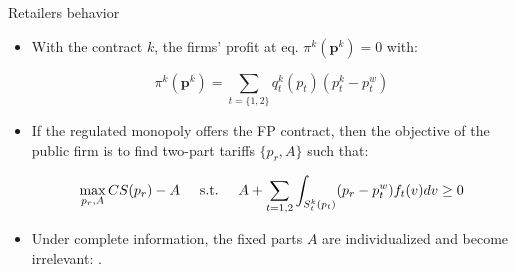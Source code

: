 \documentclass{class}
\begin{document}

\begin{frame}{Retailers behavior}

\begin{itemize}
    \item With the contract $k$, the firms' profit at eq. $ \pi^k(\textbf{p}^{k}) = 0$ with:

\vfill

\begin{equation*}
 \pi^k(\textbf{p}^{k}) = \sum_{t =\{1,2\}} q^k_t(p_t)(p^k_t - p_t^w)
\end{equation*}

\vfill

\item If the regulated monopoly offers the FP contract, then the objective of the public firm is to find two-part tariffs $\{p_r,A\}$ such that:

\vfill

\begin{equation*}
 \max_{p_r,A} CS(p_r) - A \hspace{0.5cm} \text{s.t.} \hspace{0.5cm} A + \sum_{t=1,2} \int_{S_t^k(p_t)} (p_r-p_t^w)f_t(v)dv\geq 0
\end{equation*}

\vfill

\item Under complete information, the fixed parts $A$ are individualized and become irrelevant: . 


\end{itemize}

    
\end{frame}





\end{document}
